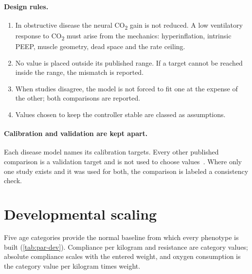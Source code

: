 \paragraph{Design rules.}
\begin{enumerate}[leftmargin=*]
  \item In obstructive disease the neural CO\textsubscript{2} gain is not reduced. A low ventilatory response to CO\textsubscript{2} must arise from the mechanics: hyperinflation, intrinsic PEEP, muscle geometry, dead space and the rate ceiling.
  \item No value is placed outside its published range. If a target cannot be reached inside the range, the mismatch is reported.
  \item When studies disagree, the model is not forced to fit one at the expense of the other; both comparisons are reported.
  \item Values chosen to keep the controller stable are classed as assumptions.
\end{enumerate}

\paragraph{Calibration and validation are kept apart.} Each disease model names its calibration targets. Every other published comparison is a validation target and is not used to choose values~\citep{oberkampf2010,asme_vv40}. Where only one study exists and it was used for both, the comparison is labeled a consistency check.

\section{Developmental scaling}
\label{sec:par-dev}
Five age categories provide the normal baseline from which every phenotype is built (\cref{tab:par-dev}). Compliance per kilogram and resistance are category values; absolute compliance scales with the entered weight, and oxygen consumption is the category value per kilogram times weight.

\begin{table}[htbp]\centering\small
\caption{Age-category baselines.}
\label{tab:par-dev}
\end{table}

